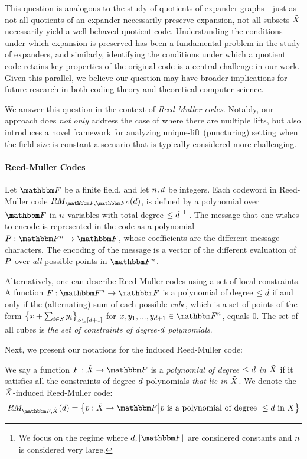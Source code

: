 This question is analogous to the study of quotients of expander graphs—just as not all quotients of an expander necessarily preserve expansion,
not all subsets ${\tilde{X}}$ necessarily yield a well-behaved quotient code.
Understanding the conditions under which expansion is preserved has been a fundamental problem in the study of expanders,
and similarly, identifying the conditions under which a quotient code retains key properties of the original code is a central challenge in our work.
Given this parallel, we believe our question may have broader implications for future research in both coding theory and theoretical computer science.

We answer this question in the context of \emph{Reed-Muller codes}.
Notably, our approach does \emph{not only} address the case of where there are multiple lifts,
but also introduces a novel framework for analyzing unique-lift (puncturing) setting when the field size is constant-a scenario that is typically considered more challenging.

\paragraph{Reed-Muller Codes}
Let $\basefield$ be a finite field, and let $n, d$ be integers.
Each codeword in Reed-Muller code $\reedmullercodeex{\basefield}{\field}{\degree}$,
is defined by a polynomial over $\basefield$ in $n$ variables with total degree $\leq d$
\footnote{We focus on the regime where $\degree, \abs{\basefield}$ are considered constants and $n$ is considered very large.}
.
The message that one wishes to encode is represented in the code as a polynomial $\funcdef{\genpoly}{\field}{\basefield}$, whose coefficients are the different message characters.
The encoding of the message is a vector of the different evaluation of $\genpoly$ over \emph{all} possible points in $\field$.

Alternatively, one can describe Reed-Muller codes using a set of local constraints.
A function $\funcdef{\genfunc}{\field}{\basefield}$ is a polynomial of degree $\leq d$
if and only if the (alternating) sum of each possible \emph{cube}, which is a set of points of the form $\left\{ x + \sum_{i \in S} y_i \right\}_{S \subseteq \left[ d + 1 \right]}$ for $x, y_1,...,y_{\degree+1} \in \field$, equals $0$.
The set of all cubes is \emph{the set of constraints of degree-$d$ polynomials}.

Next, we present our notations for the induced Reed-Muller code:
\begin{notation}
    We say a function $\funcdef{\genfunc}{\variety}{\basefield}$ is a \emph{polynomial of degree $\leq d$ \emph{in ${\tilde{X}}$}}
    if it satisfies all the constraints of degree-$d$ polynomials \emph{that lie in ${\tilde{X}}$}.
    \newline
    We denote the ${\tilde{X}}$-induced Reed-Muller code:
    \[
        \reedmullercodeex{\basefield}{\variety}{\degree} = \set{\funcdef{\onvarpoly}{\variety}{\basefield} \suchthat \onvarpoly \text{ is a polynomial of degree } \leq \degree \text{ in } \variety}
    \]
\end{notation}

